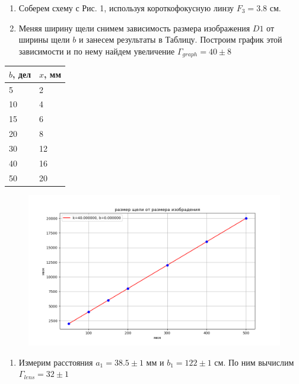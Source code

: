 \documentclass[a4paper, 12pt]{article}
\begin{document}
\begin{enumerate}
    \item Соберем схему с Рис. 1, используя короткофокусную линзу $F_3 = 3.8$ см.
    \item Меняя ширину щели снимем зависимость размера изображения $D1$ от ширины щели $b$ и занесем результаты в Таблицу. Построим график этой зависимости и по нему найдем увеличение $\Gamma_{graph} = 40 \pm 8$ 

\end{enumerate}
        \begin{tabular}{|ll|}
        \hline
        \multicolumn{1}{|l|}{$b$, дел} & $x$, мм \\ \hline
        5                 			  & 2       \\ \hline
        10                            & 4       \\ \hline
        15                            & 6     \\ \hline
        20                            & 8       \\ \hline
        30                            & 12     \\ \hline
        40                            & 16     \\ \hline
        50                            & 20      \\ \hline
        \end{tabular}
        \label{table::size}

	\begin{figure}[h!]
		\includegraphics[width=150mm]{data1.png}
	\end{figure}
\begin{enumerate}
    \item Измерим расстояния $a_1 = 38.5 \pm 1$ мм и $b_1 = 122 \pm 1$ см. По ним вычислим $\Gamma_{lens} = 32 \pm 1$
\end{enumerate}
\end{document}
